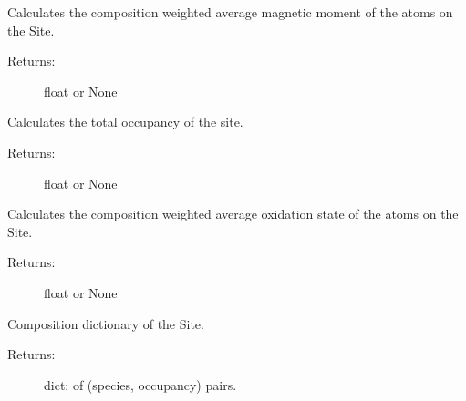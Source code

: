 \documentclass[letterpaper,10pt,english]{sphinxmanual}
\begin{document}
\begin{fulllineitems}
\begin{fulllineitems}
\end{fulllineitems}


\begin{fulllineitems}
\label{models:qmpy.Site.magmom}
Calculates the composition weighted average magnetic moment of the atoms 
on the Site.
\begin{description}
\item[{Returns:}] \leavevmode
float or None

\end{description}

\end{fulllineitems}


\begin{fulllineitems}
\label{models:qmpy.Site.occupancy}
Calculates the total occupancy of the site.
\begin{description}
\item[{Returns:}] \leavevmode
float or None

\end{description}

\end{fulllineitems}


\begin{fulllineitems}
\label{models:qmpy.Site.ox}
Calculates the composition weighted average oxidation state of the atoms 
on the Site.
\begin{description}
\item[{Returns:}] \leavevmode
float or None

\end{description}

\end{fulllineitems}


\begin{fulllineitems}
\label{models:qmpy.Site.spec_comp}
Composition dictionary of the Site.
\begin{description}
\item[{Returns:}] \leavevmode
dict: of (species, occupancy) pairs.

\end{description}


\end{fulllineitems}
\end{fulllineitems}
\end{document}
